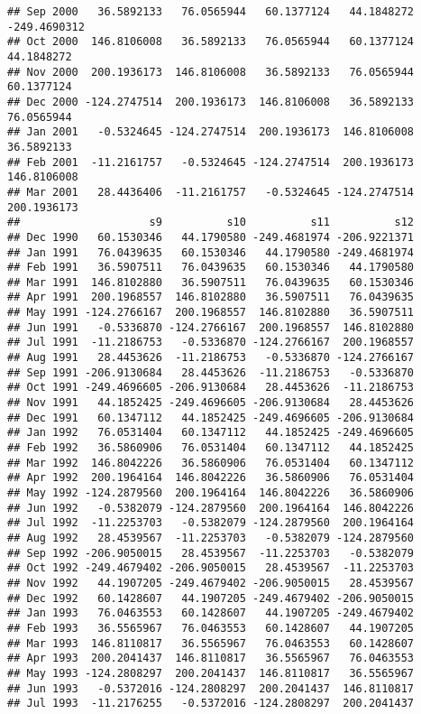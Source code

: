 \documentclass[]{article}
\begin{document}
\begin{verbatim}
## Sep 2000   36.5892133   76.0565944   60.1377124   44.1848272 -249.4690312
## Oct 2000  146.8106008   36.5892133   76.0565944   60.1377124   44.1848272
## Nov 2000  200.1936173  146.8106008   36.5892133   76.0565944   60.1377124
## Dec 2000 -124.2747514  200.1936173  146.8106008   36.5892133   76.0565944
## Jan 2001   -0.5324645 -124.2747514  200.1936173  146.8106008   36.5892133
## Feb 2001  -11.2161757   -0.5324645 -124.2747514  200.1936173  146.8106008
## Mar 2001   28.4436406  -11.2161757   -0.5324645 -124.2747514  200.1936173
##                    s9          s10          s11          s12
## Dec 1990   60.1530346   44.1790580 -249.4681974 -206.9221371
## Jan 1991   76.0439635   60.1530346   44.1790580 -249.4681974
## Feb 1991   36.5907511   76.0439635   60.1530346   44.1790580
## Mar 1991  146.8102880   36.5907511   76.0439635   60.1530346
## Apr 1991  200.1968557  146.8102880   36.5907511   76.0439635
## May 1991 -124.2766167  200.1968557  146.8102880   36.5907511
## Jun 1991   -0.5336870 -124.2766167  200.1968557  146.8102880
## Jul 1991  -11.2186753   -0.5336870 -124.2766167  200.1968557
## Aug 1991   28.4453626  -11.2186753   -0.5336870 -124.2766167
## Sep 1991 -206.9130684   28.4453626  -11.2186753   -0.5336870
## Oct 1991 -249.4696605 -206.9130684   28.4453626  -11.2186753
## Nov 1991   44.1852425 -249.4696605 -206.9130684   28.4453626
## Dec 1991   60.1347112   44.1852425 -249.4696605 -206.9130684
## Jan 1992   76.0531404   60.1347112   44.1852425 -249.4696605
## Feb 1992   36.5860906   76.0531404   60.1347112   44.1852425
## Mar 1992  146.8042226   36.5860906   76.0531404   60.1347112
## Apr 1992  200.1964164  146.8042226   36.5860906   76.0531404
## May 1992 -124.2879560  200.1964164  146.8042226   36.5860906
## Jun 1992   -0.5382079 -124.2879560  200.1964164  146.8042226
## Jul 1992  -11.2253703   -0.5382079 -124.2879560  200.1964164
## Aug 1992   28.4539567  -11.2253703   -0.5382079 -124.2879560
## Sep 1992 -206.9050015   28.4539567  -11.2253703   -0.5382079
## Oct 1992 -249.4679402 -206.9050015   28.4539567  -11.2253703
## Nov 1992   44.1907205 -249.4679402 -206.9050015   28.4539567
## Dec 1992   60.1428607   44.1907205 -249.4679402 -206.9050015
## Jan 1993   76.0463553   60.1428607   44.1907205 -249.4679402
## Feb 1993   36.5565967   76.0463553   60.1428607   44.1907205
## Mar 1993  146.8110817   36.5565967   76.0463553   60.1428607
## Apr 1993  200.2041437  146.8110817   36.5565967   76.0463553
## May 1993 -124.2808297  200.2041437  146.8110817   36.5565967
## Jun 1993   -0.5372016 -124.2808297  200.2041437  146.8110817
## Jul 1993  -11.2176255   -0.5372016 -124.2808297  200.2041437

\end{verbatim}
\end{document}
